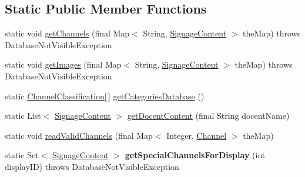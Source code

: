 \subsection*{Static Public Member Functions}
\begin{DoxyCompactItemize}
\item 
static void \hyperlink{classgov_1_1fnal_1_1ppd_1_1dd_1_1db_1_1ChannelsFromDatabase_a4f56bc3df86bc166d052a5e1df5be71a}{get\-Channels} (final Map$<$ String, \hyperlink{interfacegov_1_1fnal_1_1ppd_1_1dd_1_1signage_1_1SignageContent}{Signage\-Content} $>$ the\-Map)  throws Database\-Not\-Visible\-Exception 
\item 
static void \hyperlink{classgov_1_1fnal_1_1ppd_1_1dd_1_1db_1_1ChannelsFromDatabase_aaff901450a95798cbb5ed035d2ab3af6}{get\-Images} (final Map$<$ String, \hyperlink{interfacegov_1_1fnal_1_1ppd_1_1dd_1_1signage_1_1SignageContent}{Signage\-Content} $>$ the\-Map)  throws Database\-Not\-Visible\-Exception 
\item 
static \hyperlink{classgov_1_1fnal_1_1ppd_1_1dd_1_1changer_1_1ChannelClassification}{Channel\-Classification}\mbox{[}$\,$\mbox{]} \hyperlink{classgov_1_1fnal_1_1ppd_1_1dd_1_1db_1_1ChannelsFromDatabase_a378b7b3be0eb4f7194b4df3adad1ba82}{get\-Categories\-Database} ()
\item 
static List$<$ \hyperlink{interfacegov_1_1fnal_1_1ppd_1_1dd_1_1signage_1_1SignageContent}{Signage\-Content} $>$ \hyperlink{classgov_1_1fnal_1_1ppd_1_1dd_1_1db_1_1ChannelsFromDatabase_a7a75e0d979b68647f696f9a0ac717d64}{get\-Docent\-Content} (final String docent\-Name)
\item 
static void \hyperlink{classgov_1_1fnal_1_1ppd_1_1dd_1_1db_1_1ChannelsFromDatabase_af16576924537b6cb3ea6f742b3d5cbfb}{read\-Valid\-Channels} (final Map$<$ Integer, \hyperlink{interfacegov_1_1fnal_1_1ppd_1_1dd_1_1signage_1_1Channel}{Channel} $>$ the\-Map)
\item 
\hypertarget{classgov_1_1fnal_1_1ppd_1_1dd_1_1db_1_1ChannelsFromDatabase_a1829d1fc9e948a3b0c3d0cf57d669b38}{static Set$<$ \hyperlink{interfacegov_1_1fnal_1_1ppd_1_1dd_1_1signage_1_1SignageContent}{Signage\-Content} $>$ {\bfseries get\-Special\-Channels\-For\-Display} (int display\-I\-D)  throws Database\-Not\-Visible\-Exception }\label{classgov_1_1fnal_1_1ppd_1_1dd_1_1db_1_1ChannelsFromDatabase_a1829d1fc9e948a3b0c3d0cf57d669b38}

\end{DoxyCompactItemize}



